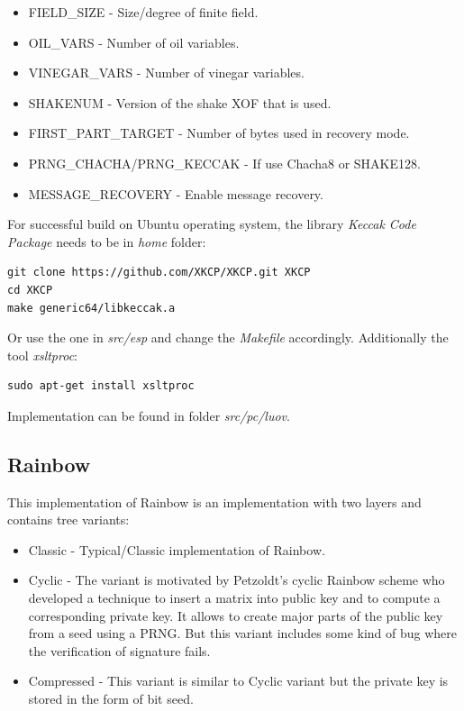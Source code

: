 \documentclass[thesis=M,english]{FITthesis}[2019/12/23]
\begin{document}
\begin{itemize}
\item	FIELD\_SIZE - Size/degree of finite field.
\item	OIL\_VARS - Number of oil variables.
\item	VINEGAR\_VARS - Number of vinegar variables.
\item	SHAKENUM - Version of the shake XOF that is used.
\item	FIRST\_PART\_TARGET - Number of bytes used in recovery mode.
\item	PRNG\_CHACHA/PRNG\_KECCAK - If use Chacha8 or SHAKE128.
\item	MESSAGE\_RECOVERY - Enable message recovery.
\end{itemize}

For successful build on Ubuntu operating system, the library \textit{Keccak Code Package} needs to be in \textit{home} folder:
\begin{lstlisting}[frame=single]
git clone https://github.com/XKCP/XKCP.git XKCP
cd XKCP
make generic64/libkeccak.a
\end{lstlisting}
Or use the one in \textit{src/esp} and change the \textit{Makefile} accordingly. Additionally the tool \textit{xsltproc}:
\begin{lstlisting}[frame=single]
sudo apt-get install xsltproc
\end{lstlisting}

\bigskip
\noindent
Implementation can be found in folder \textit{src/pc/luov}.

\subsection{Rainbow}
This implementation of Rainbow is an implementation with two layers and contains tree variants:
\begin{itemize}
\item	Classic - Typical/Classic implementation of Rainbow.
\item	Cyclic - The variant is motivated by Petzoldt's cyclic Rainbow scheme\cite{L-RB-CYC} who developed a technique to insert a matrix into public key and to compute a corresponding private key. It allows to create major parts of the public key from a seed using a PRNG. But this variant includes some kind of bug where the verification of signature fails.
\item	Compressed - This variant is similar to Cyclic variant but the private key is stored in the form of bit seed.
\end{itemize}
\end{document}
